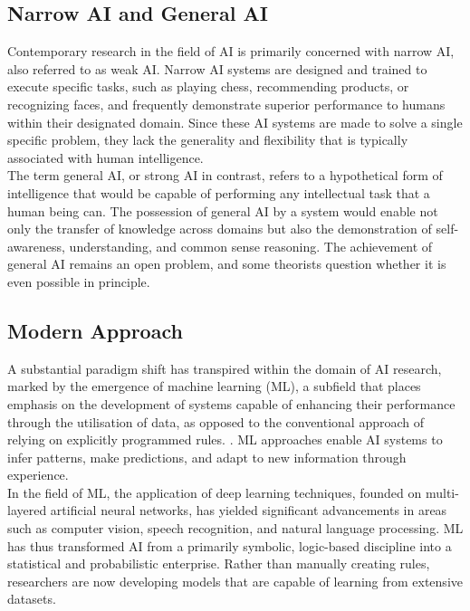 \documentclass[runningheads]{llncs}
\begin{document}
\subsection{Narrow AI and General AI}
%
Contemporary research in the field of AI is primarily concerned with narrow AI, also referred to as weak AI. Narrow AI systems are designed and trained to execute specific tasks, such as playing chess, recommending products, or recognizing faces, and frequently demonstrate superior performance to humans within their designated domain. Since these AI systems are made to solve a single specific problem, they lack the generality and flexibility that is typically associated with human intelligence.
\\
The term general AI, or strong AI in contrast, refers to a hypothetical form of intelligence that would be capable of performing any intellectual task that a human being can. The possession of general AI by a system would enable not only the transfer of knowledge across domains but also the demonstration of self-awareness, understanding, and common sense reasoning. The achievement of general AI remains an open problem, and some theorists question whether it is even possible in principle.
%
%
\subsection{Modern Approach}
%
A substantial paradigm shift has transpired within the domain of AI research, marked by the emergence of machine learning (ML), a subfield that places emphasis on the development of systems capable of enhancing their performance through the utilisation of data, as opposed to the conventional approach of relying on explicitly programmed rules. 
\cite{russell}. 
ML approaches enable AI systems to infer patterns, make predictions, and adapt to new information through experience.
\\
In the field of ML, the application of deep learning techniques, founded on multi-layered artificial neural networks, has yielded significant advancements in areas such as computer vision, speech recognition, and natural language processing. ML has thus transformed AI from a primarily symbolic, logic-based discipline into a statistical and probabilistic enterprise. Rather than manually creating rules, researchers are now developing models that are capable of learning from extensive datasets.
%
%
\end{document}
